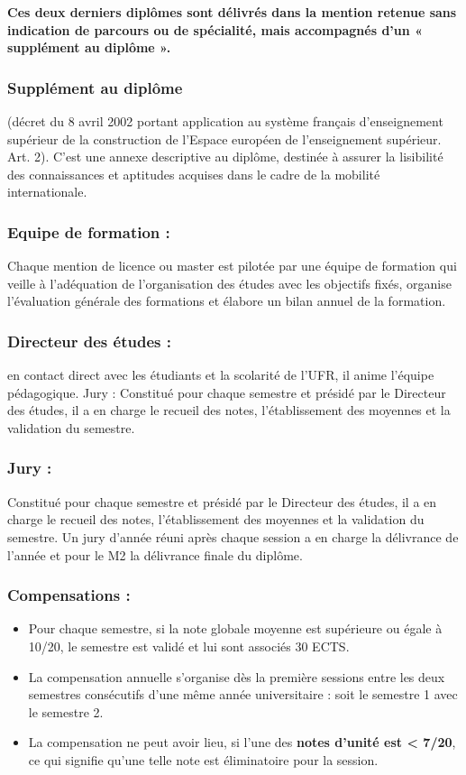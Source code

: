 \documentclass[10pt, a5paper]{report}
\begin{document}
\begin{spacing}{1.5}
\textbf{Ces deux derniers diplômes sont délivrés dans la mention retenue sans indication de parcours ou de spécialité, mais accompagnés d’un « supplément au diplôme ».}

\subsubsection*{Supplément au diplôme} 

(décret du 8 avril 2002 portant application au système français d’enseignement supérieur de la construction de l’Espace européen de l’enseignement supérieur. Art. 2). C’est une annexe descriptive au diplôme,  destinée à assurer la lisibilité des connaissances et aptitudes acquises dans le cadre de la mobilité internationale.

\subsubsection*{Equipe de formation :} Chaque mention de licence ou master est pilotée par une équipe de formation qui veille à l’adéquation de l’organisation des études avec les objectifs fixés, organise l’évaluation générale des formations et élabore  un bilan annuel de la formation.


\subsubsection*{Directeur des études :} en contact direct avec les étudiants et la scolarité de l’UFR, il anime l’équipe pédagogique.
Jury : Constitué pour chaque semestre et présidé par le Directeur des études, il a en charge le recueil des notes, l’établissement des moyennes et la validation du semestre.


\subsubsection*{Jury :} Constitué pour chaque semestre et présidé par le Directeur des études, il a en charge le recueil des notes, l’établissement des moyennes et la validation du semestre. Un jury d’année réuni après chaque session a en charge la délivrance de l’année et pour le M2 la délivrance finale du diplôme.

\subsubsection*{Compensations :}

\begin{itemize}
\item Pour chaque semestre, si la note globale moyenne est supérieure ou égale à 10/20, le semestre est validé et lui sont associés 30 ECTS.
\item La compensation annuelle s'organise dès la première sessions entre les deux semestres consécutifs d'une même année universitaire : soit le semestre 1 avec le semestre 2.
\item La compensation ne peut avoir lieu, si l’une des \textbf{notes d’unité est < 7/20}, ce qui signifie qu’une telle note est éliminatoire pour la session.
\end{itemize}



\end{spacing}
\end{document}
